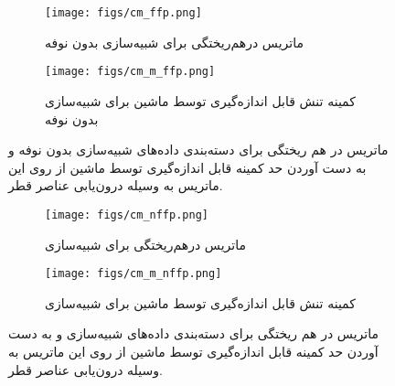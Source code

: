   	\begin{figure}
  		\centering
  		\begin{subfigure}{\textwidth}
  			\centering
  			\texttt{[image: figs/cm\_ffp.png]}
  			\caption{  ماتریس درهم‌ریختگی برای شبیه‌سازی 
  				بدون نوفه }
  		\end{subfigure}%
  		
  		\begin{subfigure}{0.5\linewidth}
  			\centering
  			\texttt{[image: figs/cm\_m\_ffp.png]}
  			\caption{  کمینه تنش قابل اندازه‌گیری توسط ماشین برای شبیه‌سازی 
  				بدون نوفه }
  		\end{subfigure}
  		
  		\caption{ماتریس در هم ریختگی برای دسته‌بندی داده‌های شبیه‌سازی
  			بدون نوفه و به دست آوردن حد کمینه قابل اندازه‌گیری توسط ماشین از روی این ماتریس به وسیله درون‌یابی عناصر قطر.}
  		\label{fig:ffp_cm}
  	\end{figure}
  	\begin{figure}
  		\centering
  		\begin{subfigure}{\textwidth}
  			\centering
  			\texttt{[image: figs/cm\_nffp.png]}
  			\caption{  ماتریس درهم‌ریختگی برای شبیه‌سازی 
  			}
  		\end{subfigure}%
  		
  		\begin{subfigure}{0.5\linewidth}
  			\centering
  			\texttt{[image: figs/cm\_m\_nffp.png]}
  			\caption{  کمینه تنش قابل اندازه‌گیری توسط ماشین برای شبیه‌سازی 
  			}
  		\end{subfigure}
  		
  		\caption{ماتریس در هم ریختگی برای دسته‌بندی داده‌های شبیه‌سازی
  			و به دست آوردن حد کمینه قابل اندازه‌گیری توسط ماشین از روی این ماتریس به وسیله درون‌یابی عناصر قطر.}
  		\label{fig:nffp_cm}
  	\end{figure}
  	
  	
    	
